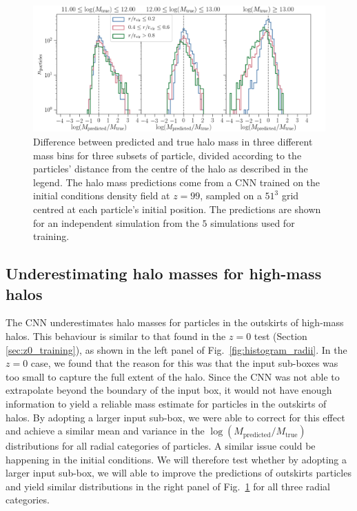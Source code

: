 \documentclass[11pt]{article}
\begin{document}
\begin{figure}[t]
\centering
\includegraphics[width=\columnwidth]{z99/histogram_radii.png}
\caption{Difference between predicted and true halo mass in three different mass bins for three subsets of particle, divided according to the particles' distance from the centre of the halo as described in the legend. The halo mass predictions come from a CNN trained on the initial conditions density field at $z=99$, sampled on a $51^3$ grid centred at each particle's initial position. The predictions are shown for an independent simulation from the $5$ simulations used for training.}
\label{fig:z99_predictions}
\end{figure}

\subsection{Underestimating halo masses for high-mass halos}

The CNN underestimates halo masses for particles in the outskirts of high-mass halos. This behaviour is similar to that found in the $z=0$ test (Section \ref{sec:z0_training}), as shown in the left panel of Fig.~\ref{fig:histogram_radii}. In the $z=0$ case, we found that the reason for this was that the input sub-boxes was too small to capture the full extent of the halo. Since the CNN was not able to extrapolate beyond the boundary of the input box, it would not have enough information to yield a reliable mass estimate for particles in the outskirts of halos. By adopting a larger input sub-box, we were able to correct for this effect and achieve a similar mean and variance in the $\log(M_\mathrm{predicted}/M_\mathrm{true})$ distributions for all radial categories of particles. A similar issue could be happening in the initial conditions. We will therefore test whether by adopting a larger input sub-box, we will able to improve the predictions of outskirts particles and yield similar distributions in the right panel of Fig.~\ref{fig:z99_predictions} for all three radial categories.
\end{document}
